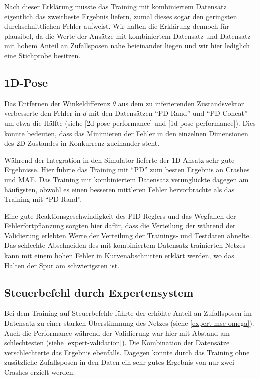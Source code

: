 Nach dieser Erklärung müsste das Training mit kombiniertem Datensatz eigentlich das zweitbeste Ergebnis liefern, zumal dieses sogar den geringsten durchschnittlichen Fehler aufweist. Wir halten die Erklärung dennoch für plausibel, da die Werte der Ansätze mit kombiniertem Datensatz und Datensatz mit hohem Anteil an Zufallsposen nahe beieinander liegen und wir hier lediglich eine Stichprobe besitzen.

\subsection{1D-Pose}

Das Entfernen der Winkeldifferenz $\theta$ aus dem zu inferierenden Zustandsvektor verbesserte den Fehler in $d$ mit den Datensätzen ``PD-Rand'' und ``PD-Concat'' um etwa die Hälfte (siehe \ref{2d-pose-performance} und \ref{1d-pose-performance}). Dies könnte bedeuten, dass das Minimieren der Fehler in den einzelnen Dimensionen des 2D Zustandes in Konkurrenz zueinander steht.

Während der Integration in den Simulator lieferte der 1D Ansatz sehr gute Ergebnisse. Hier führte das Training mit ``PD'' zum besten Ergebnis an Crashes und MAE. Das Training mit kombiniertem Datensatz verunglückte dagegen am häufigsten, obwohl es einen besseren mittleren Fehler hervorbrachte als das Training mit ``PD-Rand''.

Eine gute Reaktionsgeschwindigkeit des PID-Reglers und das Wegfallen der Fehlerfortpflanzung sorgten hier dafür, dass die Verteilung der während der Validierung erlebten Werte der Verteilung der Trainings- und Testdaten ähnelte. Das schlechte Abschneiden des mit kombiniertem Datensatz trainierten Netzes kann mit einem hohen Fehler in Kurvenabschnitten erklärt werden, wo das Halten der Spur am schwierigsten ist.

\subsection{Steuerbefehl durch Expertensystem}

Bei dem Training auf Steuerbefehle führte der erhöhte Anteil an Zufallsposen im Datensatz zu einer starken Überstimmung des Netzes (siehe \ref{expert-mse-omega}). Auch die Performance während der Validierung war hier mit Abstand am schlechtesten (siehe \ref{expert-validation}).  Die Kombination der Datensätze verschlechterte das Ergebnis ebenfalls. Dagegen konnte durch das Training ohne zusätzliche Zufallsposen in den Daten ein sehr gutes Ergebnis von nur zwei Crashes erzielt werden.

